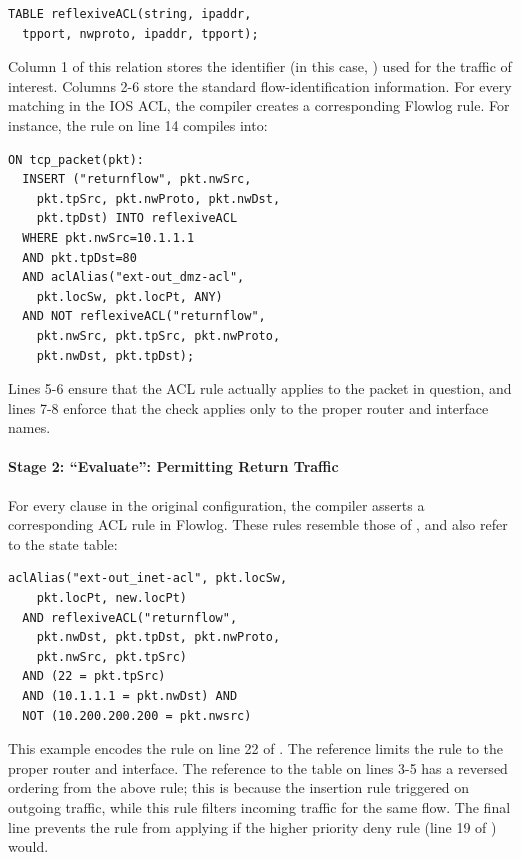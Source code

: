 \begin{lstlisting}[label=lst:flowlog-racl-table,language=Flowlog]
TABLE reflexiveACL(string, ipaddr, 
  tpport, nwproto, ipaddr, tpport);
\end{lstlisting}

Column 1 of this relation stores the identifier (in this case, )
used for the traffic of interest. Columns 2-6 store the standard
flow-identification information. For every matching  in the IOS
ACL, the compiler creates a corresponding Flowlog 
rule. For instance, the rule on line 14 compiles into:

\begin{lstlisting}[label=lst:flowlog-racl-insert,language=Flowlog]
ON tcp_packet(pkt):
  INSERT ("returnflow", pkt.nwSrc, 
    pkt.tpSrc, pkt.nwProto, pkt.nwDst,
    pkt.tpDst) INTO reflexiveACL
  WHERE pkt.nwSrc=10.1.1.1 
  AND pkt.tpDst=80
  AND aclAlias("ext-out_dmz-acl", 
    pkt.locSw, pkt.locPt, ANY) 
  AND NOT reflexiveACL("returnflow", 
    pkt.nwSrc, pkt.tpSrc, pkt.nwProto, 
    pkt.nwDst, pkt.tpDst);
\end{lstlisting}
Lines 5-6 ensure that the ACL rule actually applies to the packet in
question, and lines 7-8 enforce that the check applies only to the
proper router and interface names. 

\paragraph{Stage 2: ``Evaluate'': Permitting Return Traffic}

For every  clause in the original configuration, the compiler asserts a
corresponding ACL rule in Flowlog. These rules resemble those of ,
and also refer to the  state table:
\begin{lstlisting}[label=lst:flowlog-racl-rule,language=Flowlog]
  aclAlias("ext-out_inet-acl", pkt.locSw, 
    pkt.locPt, new.locPt)  
  AND reflexiveACL("returnflow", 
    pkt.nwDst, pkt.tpDst, pkt.nwProto, 
    pkt.nwSrc, pkt.tpSrc) 
  AND (22 = pkt.tpSrc) 
  AND (10.1.1.1 = pkt.nwDst) AND 
  NOT (10.200.200.200 = pkt.nwsrc)
\end{lstlisting}

\noindent
This example encodes the  rule on line 22 of
. The  reference
limits the rule to the proper router and interface. The
reference to the  table on lines 3-5 has a reversed
ordering from the above  rule;
this is because the insertion rule triggered on outgoing traffic, while
this rule filters incoming traffic for the same flow. The final line
prevents the rule from applying if the higher priority deny rule
(line 19 of ) would.

